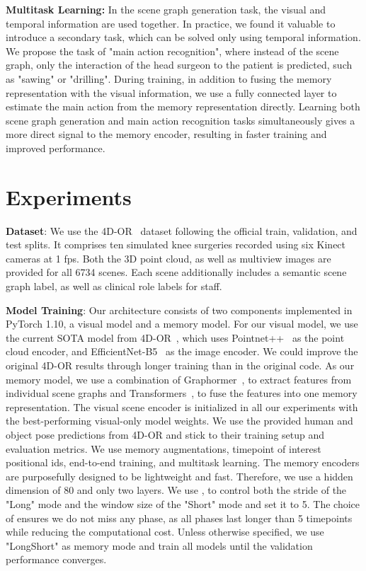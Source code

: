 \documentclass[runningheads]{llncs}
\begin{document}
\noindent \textbf{Multitask Learning:}
In the scene graph generation task, the visual and temporal information are used together. In practice, we found it valuable to introduce a secondary task, which can be solved only using temporal information. We propose the task of "main action recognition", where instead of the scene graph, only the interaction of the head surgeon to the patient is predicted, such as "sawing" or "drilling". During training, in addition to fusing the memory representation with the visual information,  we use a fully connected layer to estimate the main action from the memory representation directly. Learning both scene graph generation and main action recognition tasks simultaneously gives a more direct signal to the memory encoder, resulting in faster training and improved performance. 

\section{Experiments}
\noindent \textbf{Dataset}: We use the 4D-OR~\cite{ozsoy20224d} dataset following the official train, validation, and test splits. It comprises ten simulated knee surgeries recorded using six Kinect cameras at 1 fps. Both the 3D point cloud, as well as multiview images are provided for all 6734 scenes. Each scene additionally includes a semantic scene graph label, as well as clinical role labels for staff.

\noindent \textbf{Model Training}: Our architecture consists of two components implemented in PyTorch 1.10, a visual model and a memory model. For our visual model, we use the current SOTA model from 4D-OR~\cite{ozsoy20224d}, which uses Pointnet++~\cite{pointnet++} as the point cloud encoder, and EfficientNet-B5~\cite{efficientnet} as the image encoder. We could improve the original 4D-OR results through longer training than in the original code. As our memory model, we use a combination of Graphormer~\cite{graphormer}, to extract features from individual scene graphs and Transformers~\cite{transformers}, to fuse the features into one memory representation. The visual scene encoder is initialized in all our experiments with the best-performing visual-only model weights. We use the provided human and object pose predictions from 4D-OR and stick to their training setup and evaluation metrics. We use memory augmentations, timepoint of interest positional ids, end-to-end training, and multitask learning. The memory encoders are purposefully designed to be lightweight and fast. Therefore, we use a hidden dimension of 80 and only two layers. We use , to control both the stride of the "Long" mode and the window size of the "Short" mode and set it to 5. The choice of  ensures we do not miss any phase, as all phases last longer than 5 timepoints while reducing the computational cost. Unless otherwise specified, we use "LongShort" as memory mode and train all models until the validation performance converges.
\end{document}
